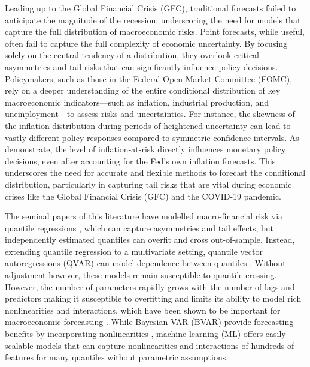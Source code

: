 \documentclass[12pt]{article}
\begin{document}
Leading up to the Global Financial Crisis (GFC), traditional forecasts failed to anticipate the magnitude of the recession, underscoring the need for models that capture the full distribution of macroeconomic risks. Point forecasts, while useful, often fail to capture the full complexity of economic uncertainty. By focusing solely on the central tendency of a distribution, they overlook critical asymmetries and tail risks that can significantly influence policy decisions. Policymakers, such as those in the Federal Open Market Committee (FOMC), rely on a deeper understanding of the entire conditional distribution of key macroeconomic indicators—such as inflation, industrial production, and unemployment—to assess risks and uncertainties. For instance, the skewness of the inflation distribution during periods of heightened uncertainty can lead to vastly different policy responses compared to symmetric confidence intervals. As \cite{andradeTAILSINFLATIONFORECASTS2012} demonstrate, the level of inflation-at-risk directly influences monetary policy decisions, even after accounting for the Fed's own inflation forecasts. This underscores the need for accurate and flexible methods to forecast the conditional distribution, particularly in capturing tail risks that are vital during economic crises like the Global Financial Crisis (GFC) and the COVID-19 pandemic. 

The seminal papers of this literature have modelled macro-financial risk via quantile regressions \citep{adrianVulnerableGrowth2019,kileyUnemploymentRisk2022,lopez-salidoInflationRisk2024}, which can capture asymmetries and tail effects, but independently estimated quantiles can overfit and cross out-of-sample. Instead, extending quantile regression to a multivariate setting, quantile vector autoregressions (QVAR) can model dependence between quantiles \citep{chavleishviliForecastingStressTesting2024}. Without adjustment however, these models remain susceptible to quantile crossing. However, the number of parameters rapidly grows with the number of lags and predictors making it susceptible to overfitting and limits its ability to model rich nonlinearities and interactions, which have been shown to be important for macroeconomic forecasting \citep{gouletcoulombeHowMachineLearning2022,pruserNonlinearitiesMacroeconomicTail2024}. While Bayesian VAR (BVAR) provide forecasting benefits by incorporating nonlinearities \citep{pruserNonlinearitiesMacroeconomicTail2024}, machine learning (ML) offers easily scalable models that can capture nonlinearities and interactions of hundreds of features for many quantiles without parametric assumptions. 
\end{document}
